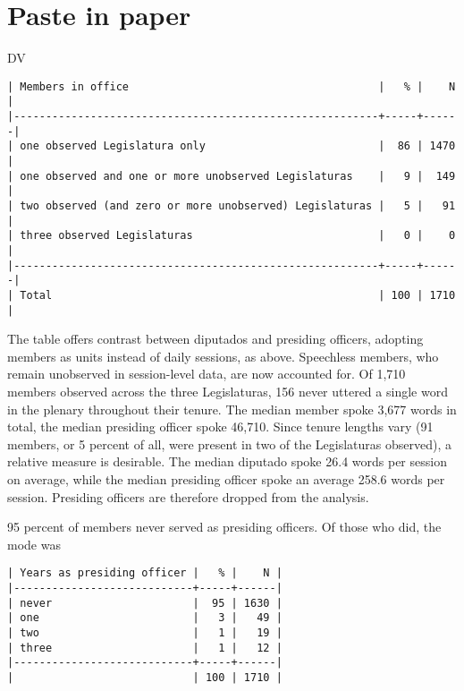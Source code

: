 \documentclass[letter,12pt]{article}
\begin{document}
\section{Paste in paper}



DV


\singlespacing
\begin{footnotesize}
\begin{verbatim}
| Members in office                                       |   % |    N |
|---------------------------------------------------------+-----+------|
| one observed Legislatura only                           |  86 | 1470 |
| one observed and one or more unobserved Legislaturas    |   9 |  149 |
| two observed (and zero or more unobserved) Legislaturas |   5 |   91 |
| three observed Legislaturas                             |   0 |    0 |
|---------------------------------------------------------+-----+------|
| Total                                                   | 100 | 1710 |
\end{verbatim}
\end{footnotesize}
\doublespacing

The table offers contrast between diputados and presiding officers, adopting members as units instead of daily sessions, as above. Speechless members, who remain unobserved in session-level data, are now accounted for. Of 1,710 members observed across the three Legislaturas, 156 never uttered a single word in the plenary throughout their tenure. The median member spoke 3,677 words in total, the median presiding officer spoke 46,710. Since tenure lengths vary (91 members, or 5 percent of all, were present in two of the Legislaturas observed), a relative measure is desirable. The median diputado spoke 26.4 words per session on average, while the median presiding officer spoke an average 258.6 words per session. Presiding officers are therefore dropped from the analysis. 

95 percent of members never served as presiding officers. Of those who did, the mode was 

\singlespacing
\begin{footnotesize}
\begin{verbatim}
| Years as presiding officer |   % |    N |
|----------------------------+-----+------|
| never                      |  95 | 1630 |
| one                        |   3 |   49 |
| two                        |   1 |   19 |
| three                      |   1 |   12 |
|----------------------------+-----+------|
|                            | 100 | 1710 |
\end{verbatim}
\end{footnotesize}
\doublespacing
\end{document}
